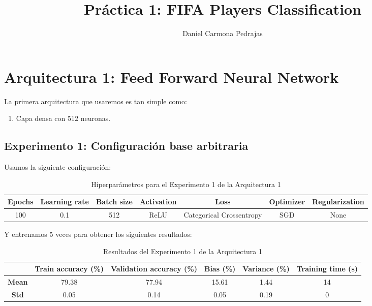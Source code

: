 \documentclass{article}
\begin{document}
\title{Pr\'actica 1: FIFA Players Classification}

\author{{Daniel Carmona Pedrajas}}

\date{}
\maketitle



	\section{Arquitectura 1: Feed Forward Neural Network}
	\label{d-s-a1}
		La primera arquitectura que usaremos es tan simple como:
		\begin{enumerate}
			\item Capa densa con 512 neuronas.
		\end{enumerate}
		\subsection{Experimento 1: Configuraci\'on base arbitraria}
		\label{d-s-a1-e1}
			Usamos la siguiente configuraci\'on:
			\begin{table}[!h]
				\begin{center}
					\begin{tabular}{| c | c | c | c | c | c | c |}
						\textbf{Epochs} & \textbf{Learning rate} & \textbf{Batch size} & \textbf{Activation} & \textbf{Loss} & \textbf{Optimizer} & \textbf{Regularization} \\ \hline
						100 & 0.1 & 512 & ReLU & Categorical Crossentropy & SGD & None
					\end{tabular}
					\caption{Hiperpar\'ametros para el Experimento 1 de la Arquitectura 1}
					\label{tab:hip-d-a1-e1}
				\end{center}
			\end{table}
		
			Y entrenamos 5 veces para obtener los siguientes resultados:
			\begin{table}[!h]
				\begin{center}
					\begin{tabular}{ c | c | c | c | c | c |}
						\ & \textbf{Train accuracy (\%)} & \textbf{Validation accuracy (\%)} & \textbf{Bias (\%)} & \textbf{Variance (\%)} & \textbf{Training time (s)} \\ \hline
						\textbf{Mean} & 79.38 & 77.94 & 15.61 & 1.44 & 14\\ \hline
						\textbf{Std} & 0.05 & 0.14 & 0.05 & 0.19 & 0 \\ \hline
					\end{tabular}
					\caption{Resultados del Experimento 1 de la Arquitectura 1}
					\label{tab:res-d-a1-e1}
				\end{center}
			\end{table}
		
\end{document}
